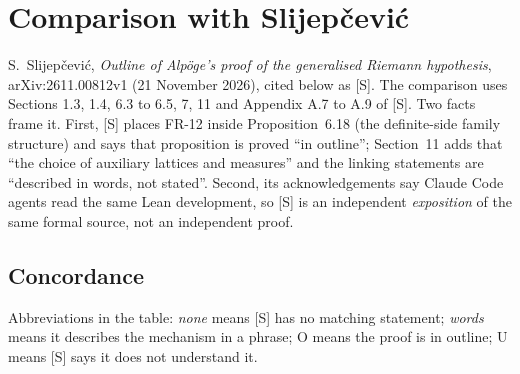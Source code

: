 \documentclass[11pt]{article}
\newcommand{\FR}[1]{\textsf{FR-#1}}
\theoremstyle{remark}
\begin{document}
\section{Comparison with Slijep\v{c}evi\'c}\label{sec:slij}

S.~Slijep\v{c}evi\'c, \emph{Outline of Alp\"oge's proof of the generalised Riemann hypothesis}, arXiv:2611.00812v1 (21 November 2026), cited below as [S]. The comparison uses Sections 1.3, 1.4, 6.3 to 6.5, 7, 11 and Appendix A.7 to A.9 of [S]. Two facts frame it. First, [S] places \FR{12} inside Proposition~6.18 (the definite-side family structure) and says that proposition is proved ``in outline''; Section~11 adds that ``the choice of auxiliary lattices and measures'' and the linking statements are ``described in words, not stated''. Second, its acknowledgements say Claude Code agents read the same Lean development, so [S] is an independent \emph{exposition} of the same formal source, not an independent proof.

\subsection*{Concordance}

Abbreviations in the table: \emph{none} means [S] has no matching statement; \emph{words} means it describes the mechanism in a phrase; O means the proof is in outline; U means [S] says it does not understand it.
\end{document}
